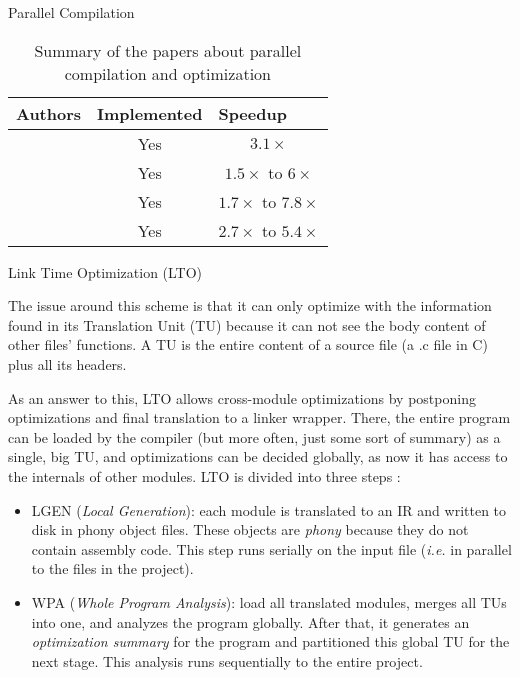 \begin{section}{Parallel Compilation}
\begin{table}[]
\begin{tabular}{|l|c|c|}
\hline
Authors      & \multicolumn{1}{l|}{Implemented} & \multicolumn{1}{l|}{Speedup} \\ \hline
 \cite{vandevoorde1988parallel} & Yes                              & $3.1\times$                         \\ \hline
 \cite{wortman1992}     & Yes                              & $1.5\times$ to $6\times$                   \\ \hline
 \cite{Lee1994}         & Yes                               & $1.7\times$ to $7.8\times$                 \\ \hline
 \cite{kramer1994combining}     & Yes                               & $2.7\times$ to $5.4\times$                 \\ \hline
\end{tabular}
\caption{Summary of the papers about parallel compilation and optimization}
\label{table:parallel_comp_opt}
\end{table}

\begin{subsection}{Link Time Optimization (LTO)}\label{lto_section}

The issue around this scheme is that it can only optimize with
the information found in its Translation Unit (TU) because it can not see the body
content of other files' functions. A TU is the
entire content of a source file (a .c file in C) plus all its headers.

As an answer to this, LTO allows cross-module optimizations by
postponing optimizations and final translation to a linker wrapper. There, the entire
program can be loaded by the compiler (but more often, just some sort of summary)
as a single, big TU, and optimizations can be decided globally,
as now it has access to the internals of other modules. LTO is divided into
three steps \citep{whoprgoogle,glek2010optimizing}:
\begin{itemize}
\item LGEN (\textit{Local Generation}): each module is translated to an IR and
written to disk in phony object files. These objects are \emph{phony} because
they do not contain assembly code. This step runs serially on the input file
(\textit{i.e.} in parallel to the files in the project).

\item WPA (\textit{Whole Program Analysis}): load all translated modules,
merges all TUs into one, and analyzes the program globally. After that, it
generates an \emph{optimization summary} for the program and partitioned this
global TU for the next stage. This analysis runs sequentially to the entire
project.


\end{itemize}
\end{subsection}
\end{section}
